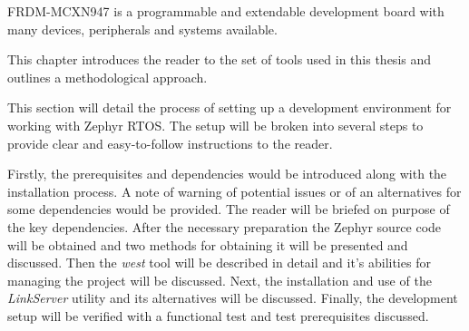 \documentclass[twoside, 12pt]{article}
\begin{document}
FRDM-MCXN947 is a programmable and extendable development board with many devices, 
peripherals and systems available.

This chapter introduces the reader to the set of tools used in this thesis and outlines a 
methodological approach.

This section will detail the process of setting up a development environment for working with
Zephyr RTOS. The setup will be broken into several steps to provide clear and easy-to-follow 
instructions to the reader.

Firstly, the prerequisites and dependencies would be introduced along with the installation 
process. A note of warning of potential issues or of an alternatives for some dependencies 
would be provided. The reader will be briefed on purpose of the key dependencies. After the 
necessary preparation the Zephyr source code will be obtained and two methods for obtaining it
will be presented and discussed. Then the \textit{west} tool will be described in detail and
it's abilities for managing the project will be discussed. Next, the installation and use of 
the \textit{LinkServer} utility and its alternatives will be discussed. Finally, the 
development setup will be verified with a functional test and test prerequisites discussed.
\end{document}
